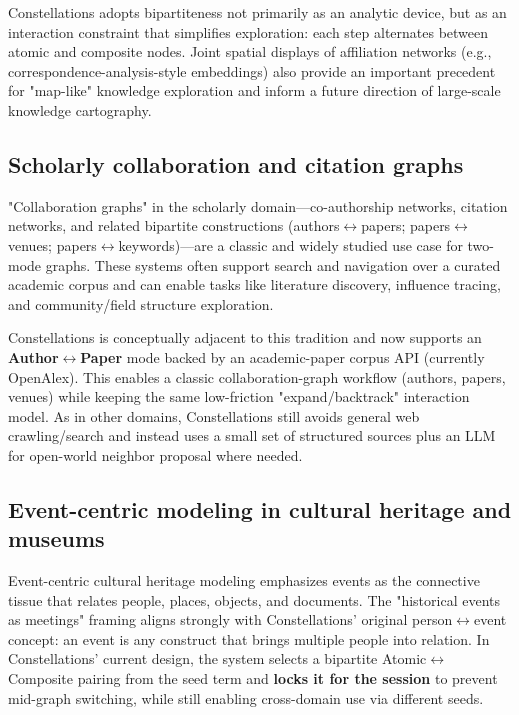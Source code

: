 Constellations adopts bipartiteness not primarily as an analytic device, but as an interaction constraint that simplifies exploration: each step alternates between atomic and composite nodes. Joint spatial displays of affiliation networks (e.g., correspondence-analysis-style embeddings) also provide an important precedent for "map-like" knowledge exploration and inform a future direction of large-scale knowledge cartography.

\subsection{Scholarly collaboration and citation graphs}

"Collaboration graphs" in the scholarly domain---co-authorship networks, citation networks, and related bipartite constructions (authors\(\leftrightarrow\)papers; papers\(\leftrightarrow\)venues; papers\(\leftrightarrow\)keywords)---are a classic and widely studied use case for two-mode graphs. These systems often support search and navigation over a curated academic corpus and can enable tasks like literature discovery, influence tracing, and community/field structure exploration.

Constellations is conceptually adjacent to this tradition and now supports an \textbf{Author\(\leftrightarrow\)Paper} mode backed by an academic-paper corpus API (currently OpenAlex). This enables a classic collaboration-graph workflow (authors, papers, venues) while keeping the same low-friction "expand/backtrack" interaction model. As in other domains, Constellations still avoids general web crawling/search and instead uses a small set of structured sources plus an LLM for open-world neighbor proposal where needed.

\subsection{Event-centric modeling in cultural heritage and museums}

Event-centric cultural heritage modeling emphasizes events as the connective tissue that relates people, places, objects, and documents. The "historical events as meetings" framing aligns strongly with Constellations' original person\(\leftrightarrow\)event concept: an event is any construct that brings multiple people into relation. In Constellations' current design, the system selects a bipartite Atomic\(\leftrightarrow\)Composite pairing from the seed term and \textbf{locks it for the session} to prevent mid-graph switching, while still enabling cross-domain use via different seeds.


